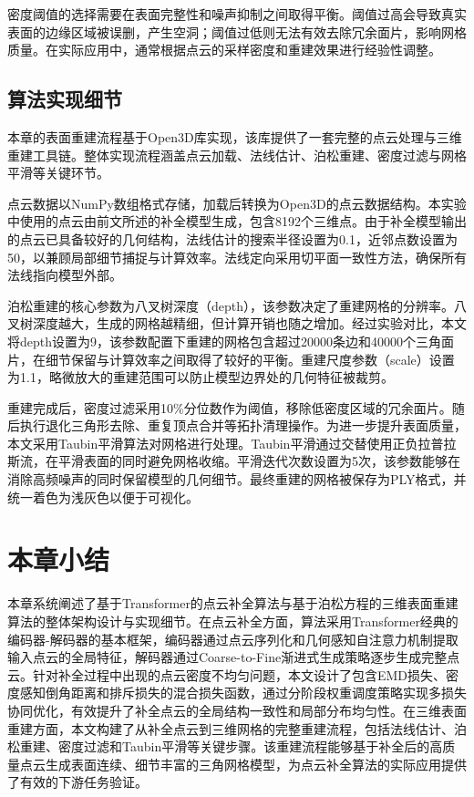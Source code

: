密度阈值的选择需要在表面完整性和噪声抑制之间取得平衡。阈值过高会导致真实表面的边缘区域被误删，产生空洞；阈值过低则无法有效去除冗余面片，影响网格质量。在实际应用中，通常根据点云的采样密度和重建效果进行经验性调整。

\subsection{算法实现细节}

本章的表面重建流程基于Open3D库实现，该库提供了一套完整的点云处理与三维重建工具链\cite{zhou2018open3d}。整体实现流程涵盖点云加载、法线估计、泊松重建、密度过滤与网格平滑等关键环节。

点云数据以NumPy数组格式存储，加载后转换为Open3D的点云数据结构。本实验中使用的点云由前文所述的补全模型生成，包含8192个三维点。由于补全模型输出的点云已具备较好的几何结构，法线估计的搜索半径设置为0.1，近邻点数设置为50，以兼顾局部细节捕捉与计算效率。法线定向采用切平面一致性方法，确保所有法线指向模型外部。

泊松重建的核心参数为八叉树深度（depth），该参数决定了重建网格的分辨率。八叉树深度越大，生成的网格越精细，但计算开销也随之增加。经过实验对比，本文将depth设置为9，该参数配置下重建的网格包含超过20000条边和40000个三角面片，在细节保留与计算效率之间取得了较好的平衡。重建尺度参数（scale）设置为1.1，略微放大的重建范围可以防止模型边界处的几何特征被裁剪。

重建完成后，密度过滤采用10\%分位数作为阈值，移除低密度区域的冗余面片。随后执行退化三角形去除、重复顶点合并等拓扑清理操作。为进一步提升表面质量，本文采用Taubin平滑算法对网格进行处理。Taubin平滑通过交替使用正负拉普拉斯流，在平滑表面的同时避免网格收缩\cite{taubin1995signal}。平滑迭代次数设置为5次，该参数能够在消除高频噪声的同时保留模型的几何细节。最终重建的网格被保存为PLY格式，并统一着色为浅灰色以便于可视化。


\section{本章小结}

本章系统阐述了基于Transformer的点云补全算法与基于泊松方程的三维表面重建算法的整体架构设计与实现细节。在点云补全方面，算法采用Transformer经典的编码器-解码器的基本框架，编码器通过点云序列化和几何感知自注意力机制提取输入点云的全局特征，解码器通过Coarse-to-Fine渐进式生成策略逐步生成完整点云。针对补全过程中出现的点云密度不均匀问题，本文设计了包含EMD损失、密度感知倒角距离和排斥损失的混合损失函数，通过分阶段权重调度策略实现多损失协同优化，有效提升了补全点云的全局结构一致性和局部分布均匀性。在三维表面重建方面，本文构建了从补全点云到三维网格的完整重建流程，包括法线估计、泊松重建、密度过滤和Taubin平滑等关键步骤。该重建流程能够基于补全后的高质量点云生成表面连续、细节丰富的三角网格模型，为点云补全算法的实际应用提供了有效的下游任务验证。
